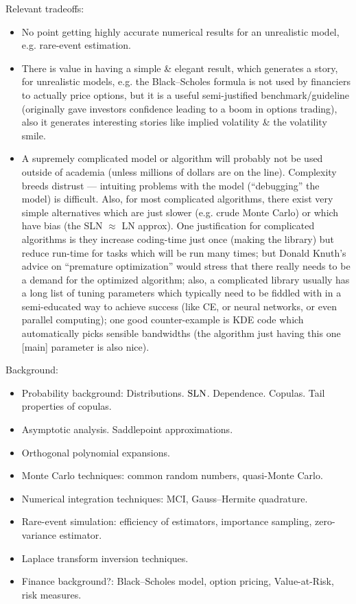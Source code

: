 Relevant tradeoffs:
\begin{itemize}
	\item No point getting highly accurate numerical results for an unrealistic model, e.g. rare-event estimation.
	\item There is value in having a simple \& elegant result, which generates a story, for unrealistic models, e.g. the Black--Scholes formula is not used by financiers to actually price options, but it is a useful semi-justified benchmark/guideline (originally gave investors confidence leading to a boom in options trading), also it generates interesting stories like implied volatility \& the volatility smile.
	\item A supremely complicated model or algorithm will probably not be used outside of academia (unless millions of dollars are on the line). Complexity breeds distrust --- intuiting problems with the model (``debugging'' the model) is difficult. Also, for most complicated algorithms, there exist very simple alternatives which are just slower (e.g. crude Monte Carlo) or which have bias (the SLN $\approx$ LN approx). One justification for complicated algorithms is they increase coding-time just once (making the library) but reduce run-time for tasks which will be run many times; but Donald Knuth's advice on ``premature optimization'' would stress that there really needs to be a demand for the optimized algorithm; also, a complicated library usually has a long list of tuning parameters which typically need to be fiddled with in a semi-educated way to achieve success (like CE, or neural networks, or even parallel computing); one good counter-example is KDE code which automatically picks sensible bandwidths (the algorithm just having this one [main] parameter is also nice).
\end{itemize}

Background:
\begin{itemize}
	\item Probability background: Distributions. $\mathrm{SLN}$. Dependence. Copulas. Tail properties of copulas.
	\item Asymptotic analysis. Saddlepoint approximations.
	\item Orthogonal polynomial expansions.
	\item Monte Carlo techniques: common random numbers, quasi-Monte Carlo.
	\item Numerical integration techniques: MCI, Gauss--Hermite quadrature.
	\item Rare-event simulation: efficiency of estimators, importance sampling, zero-variance estimator.
	\item Laplace transform inversion techniques.
	\item Finance background?: Black--Scholes model, option pricing, Value-at-Risk, risk measures.
\end{itemize}

